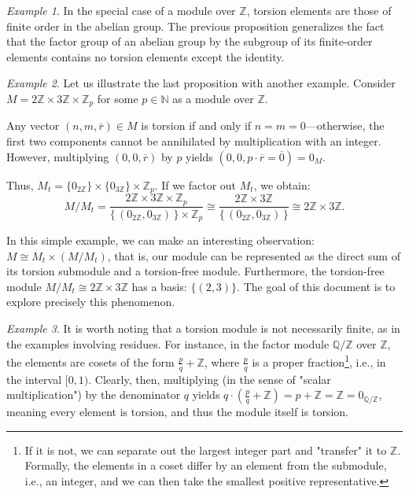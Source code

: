 \documentclass{article}
\newif\ifusemulticols
\theoremstyle{definition}
\theoremstyle{remark}
\newtheorem{example}{Example}[section]
\theoremstyle{plain}
\theoremstyle{plain}
\newenvironment{mymulticols}
    { \ifusemulticols \begin{multicols}{2} \fi }
    { \ifusemulticols \end{multicols} \fi }
\newcommand{\N}{\mathbb{N}}
\newcommand{\Z}{\mathbb{Z}}
\begin{document}
\begin{mymulticols}
\begin{example}
    In the special case of a module over $\Z$, torsion elements are those of finite order in the abelian group. 
    The previous proposition generalizes the fact that the factor group of an abelian group by the
    subgroup of its finite-order elements contains no torsion elements except the identity.
\end{example}

\begin{example}
    \label{example:torsion_ful_less_decomposition}
    Let us illustrate the last proposition with another example.
    Consider $M = 2\Z \times 3\Z \times \Z_p$ for some $p \in \N$ as a module over $\Z$.

    Any vector $(n, m, \overline{r}) \in M$ is torsion if and only if $n = m = 0$—otherwise, the
    first two components cannot be annihilated by multiplication with an integer. However,
    multiplying $(0, 0, \overline{r})$ by $p$ yields $(0, 0, p \cdot \overline{r} = \overline{0}) =
    0_M$.

    Thus, $M_t = \{ 0_{2\Z} \} \times \{ 0_{3\Z} \} \times \Z_p$.
    If we factor out $M_t$, we obtain:
    \begin{equation*}
        M / M_t
        = \frac{2\Z \times 3\Z \times \Z_p}
               {\{ \, (0_{2\Z}, 0_{3\Z}) \, \} \times \Z_p}
        \cong \frac{2\Z \times 3\Z}{\{ \, (0_{2\Z}, 0_{3\Z}) \, \}}
        \cong 2\Z \times 3\Z.
    \end{equation*}

    In this simple example, we can make an interesting observation: $M \cong M_t \times (M / M_t)$,
    that is, our module can be represented as the direct sum of its torsion submodule and a
    torsion-free module.
    Furthermore, the torsion-free module $M / M_t \cong 2\Z \times 3\Z$ has a basis: $\{ (2, 3) \}$.
    The goal of this document is to explore precisely this phenomenon.
\end{example}

\begin{example}
    It is worth noting that a torsion module is not necessarily finite, as in the examples involving
    residues. For instance, in the factor module $\mathbb{Q} / \Z$ over $\Z$, the elements are
    cosets of the form $\frac{p}{q} + \Z$, where $\frac{p}{q}$ is a proper fraction\footnote{If it
    is not, we can separate out the largest integer part and "transfer"
    it to $\Z$. Formally, the elements in a coset differ by an element from the submodule, i.e., an
    integer, and we can then take the smallest positive representative.}, i.e., in the interval $[0,
    1)$. Clearly, then, multiplying (in the sense of "scalar multiplication") by the denominator $q$
    yields $q \cdot \left(\frac{p}{q} + \Z\right) = p + \Z = \Z = 0_{\mathbb{Q} / \Z}$, meaning
    every element is torsion, and thus the module itself is torsion.
\end{example}


\end{mymulticols}
\end{document}
